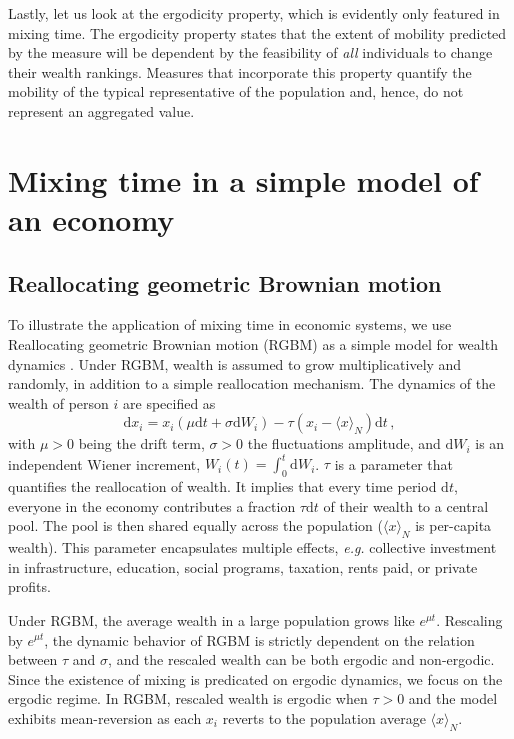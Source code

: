 \documentclass[11pt]{article}
\newcommand{\eg}{{\it e.g.}\xspace}
\newcommand{\be}{\begin{equation}}
\newcommand{\ee}{\end{equation}}
\numberwithin{equation}{section}
\begin{document}
Lastly, let us look at the ergodicity property, which is evidently only featured in mixing time. The ergodicity property states that the extent of mobility predicted by the measure will be dependent by the feasibility of \textit{all} individuals to change their wealth rankings. Measures that incorporate this property quantify the mobility of the typical representative of the population and, hence, do not represent an aggregated value.

\section{Mixing time in a simple model of an economy}\label{sec:rgbm}
\subsection{Reallocating geometric Brownian motion}

To illustrate the application of mixing time in economic systems, we use Reallocating geometric Brownian motion (RGBM) as a simple model for wealth dynamics \citep{BermanPetersAdamou2019}. Under RGBM, wealth is assumed to grow multiplicatively and randomly, in addition to a simple reallocation mechanism. The dynamics of the wealth of person $i$ are specified as
%
\be
\mathrm{d} x_i = x_i \left( \mu \mathrm{d}t + \sigma \mathrm{d}W_i \right) - \tau \left( x_i - \langle x \rangle_N \right) \mathrm{d}t\,,
\label{eq:rgbm}
\ee
%
with $\mu > 0$ being the drift term, $\sigma > 0$ the fluctuations amplitude, and $\mathrm{d}W_i$ is an independent Wiener increment, $W_i(t) =\int_0^t \mathrm{d}W_i$. $\tau$ is a parameter that quantifies the reallocation of wealth. It implies that every time period $\mathrm{d}t$, everyone in the economy contributes a fraction $\tau\mathrm{d}t$ of their wealth to a central pool. The pool is then shared equally across the population ($\langle x \rangle_N$ is per-capita wealth). This parameter encapsulates multiple effects, \eg collective investment in infrastructure, education, social programs, taxation, rents paid, or private profits.

Under RGBM, the average wealth in a large population grows like $e^{\mu t}$. Rescaling by $e^{\mu t}$, the dynamic behavior of RGBM is strictly dependent on the relation between $\tau$ and $\sigma$, and the rescaled wealth can be both ergodic and non-ergodic. Since the existence of mixing is predicated on ergodic dynamics, we focus on the ergodic regime. In RGBM, rescaled wealth is ergodic when $\tau > 0$
and the model exhibits mean-reversion as each $x_i$ reverts to the population average $\langle x \rangle_N$.
\end{document}
